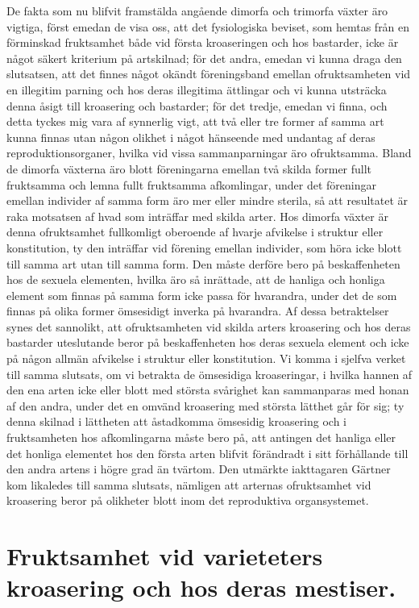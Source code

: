 De fakta som nu blifvit framstälda angående dimorfa och trimorfa växter äro vigtiga, först emedan de visa oss, att det fysiologiska beviset, som hemtas från en förminskad fruktsamhet både vid första kroaseringen och hos bastarder, icke är något säkert kriterium på artskilnad; för det andra, emedan vi kunna draga den slutsatsen, att det finnes något okändt föreningsband emellan ofruktsamheten vid en illegitim parning och hos deras illegitima ättlingar och vi kunna utsträcka denna åsigt till kroasering och bastarder; för det tredje, emedan vi finna, och detta tyckes mig vara af synnerlig vigt, att två eller tre former af samma art kunna finnas utan någon olikhet i något hänseende med undantag af deras reproduktionsorganer, hvilka vid vissa sammanparningar äro ofruktsamma. Bland de dimorfa växterna äro blott föreningarna emellan två skilda former fullt fruktsamma och lemna fullt fruktsamma afkomlingar, under det föreningar emellan individer af samma form äro mer eller mindre sterila, så att resultatet är raka motsatsen af hvad som inträffar med skilda arter. Hos dimorfa växter är denna ofruktsamhet fullkomligt oberoende af hvarje afvikelse i struktur eller konstitution, ty den inträffar vid förening emellan individer, som höra icke blott till samma art utan till samma form. Den måste derföre bero på beskaffenheten hos de sexuela elementen, hvilka äro så inrättade, att de hanliga och honliga element som finnas på samma form icke passa för hvarandra, under det de som finnas på olika former ömsesidigt inverka på hvarandra. Af dessa betraktelser synes det sannolikt, att ofruktsamheten vid skilda arters kroasering och hos deras bastarder uteslutande beror på beskaffenheten hos deras sexuela element och icke på någon allmän afvikelse i struktur eller konstitution. Vi komma i sjelfva verket till samma slutsats, om vi betrakta de ömsesidiga kroaseringar, i hvilka hannen af den ena arten icke eller blott med största svårighet kan sammanparas med honan af den andra, under det en omvänd kroasering med största lätthet går för sig; ty denna skilnad i lättheten att åstadkomma ömsesidig kroasering och i fruktsamheten hos afkomlingarna måste bero på, att antingen det hanliga eller det honliga elementet hos den första arten blifvit förändradt i sitt förhållande till den andra artens i högre grad än tvärtom. Den utmärkte iakttagaren Gärtner kom likaledes till samma slutsats, nämligen att arternas ofruktsamhet vid kroasering beror på olikheter blott inom det reproduktiva organsystemet.



\section[Fruktsamhet vid variateters kroasering]{Fruktsamhet vid varieteters kroasering och hos
deras mestiser.}

